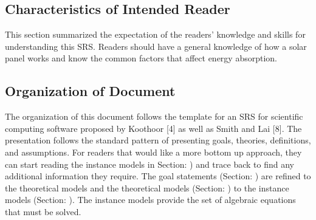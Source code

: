 \documentclass[12pt]{article}
\begin{document}
\fi

\subsection{Characteristics of Intended Reader} \label{sec_IntendedReader}

This section summarized the expectation of the readers' knowledge and skills for understanding this SRS. Readers should have a general knowledge of how a solar panel works and know the common factors that affect energy absorption.

\subsection{Organization of Document}

The organization of this document follows the template for an SRS for scientific computing
software proposed by Koothoor [4] as well as Smith and Lai [8]. The presentation follows
the standard pattern of presenting goals, theories, definitions, and assumptions. For readers
that would like a more bottom up approach, they can start reading the instance models in
Section:  ) and trace back to find any additional information they require.
The goal statements (Section:  ) are refined to the theoretical models
and the theoretical models (Section:  ) to the instance models (Section:  ). The instance models provide the set of algebraic equations that must be
solved.
\end{document}
